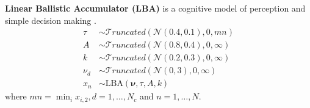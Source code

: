 \textbf{Linear Ballistic Accumulator (LBA)}
is a cognitive model of perception and simple decision making \citep{brown2008simplest}.
\begin{align}
    \tau &\sim \mathcal{T}runcated(\mathcal{N}(0.4, 0.1), 0, mn) \nonumber \\
    A &\sim \mathcal{T}runcated(\mathcal{N}(0.8, 0.4), 0, \infty) \nonumber \\
    k &\sim \mathcal{T}runcated(\mathcal{N}(0.2, 0.3), 0, \infty) \nonumber \\
    \nu_d &\sim \mathcal{T}runcated(\mathcal{N}(0, 3), 0, \infty) \nonumber \\
    x_n &\sim \text{LBA}(\bm{\nu}, \tau, A, k) \nonumber
\end{align}
where $mn=\min_i x_{i,2}, d = 1, \dots, N_c$ and $n = 1, \dots, N$.